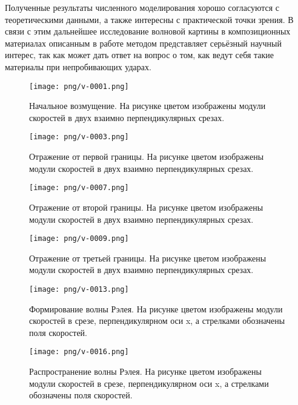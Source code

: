 Полученные результаты численного моделирования хорошо согласуются с теоретическими данными,
а также интересны с практической точки зрения. В связи с этим 
дальнейшее исследование волновой картины в композиционных
материалах описанным в работе методом представляет серьёзный научный интерес,
так как может дать ответ на вопрос о том, как ведут себя такие материалы при
непробивающих ударах.
\begin{figure}[htp]
\centering
\texttt{[image: png/v-0001.png]}
\caption{Начальное возмущение. На рисунке цветом изображены модули скоростей в
двух взаимно перпендикулярных срезах.}
\label{pic:multilayer_init}
\end{figure}
\begin{figure}[htp]
\centering
\texttt{[image: png/v-0003.png]}
\caption{Отражение от первой границы. На рисунке цветом изображены модули скоростей в
двух взаимно перпендикулярных срезах.}
\label{pic:multilayer_b1}
\end{figure}
\begin{figure}[htp]
\centering
\texttt{[image: png/v-0007.png]}
\caption{Отражение от второй границы. На рисунке цветом изображены модули скоростей в
двух взаимно перпендикулярных срезах.}
\label{pic:multilayer_b2}
\end{figure}
\begin{figure}[htp]
\centering
\texttt{[image: png/v-0009.png]}
\caption{Отражение от третьей границы. На рисунке цветом изображены модули скоростей в
двух взаимно перпендикулярных срезах.}
\label{pic:multilayer_b3}
\end{figure}
\begin{figure}[htp]
\centering
\texttt{[image: png/v-0013.png]}
\caption{Формирование волны Рэлея. На рисунке цветом изображены модули скоростей
в срезе, перпендикулярном оси x, а стрелками обозначены поля скоростей.}
\label{pic:multilayer_Rayleigh_1}
\end{figure}
\begin{figure}[htp]
\centering
\texttt{[image: png/v-0016.png]}
\caption{Распространение волны Рэлея. На рисунке цветом изображены модули скоростей
в срезе, перпендикулярном оси x, а стрелками обозначены поля скоростей.}
\label{pic:multilayer_Rayleigh_2}
\end{figure}

